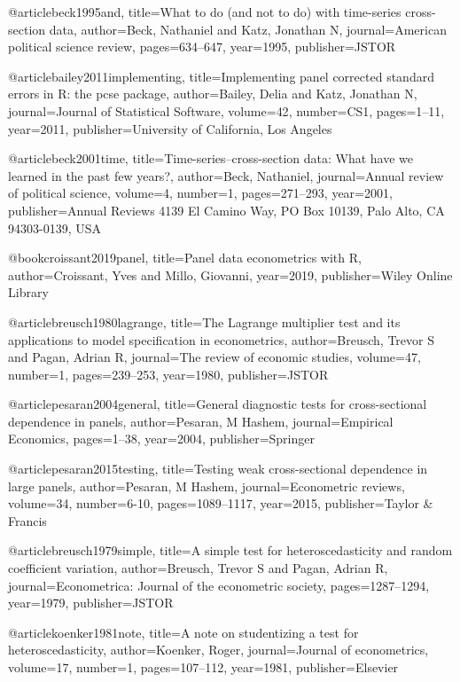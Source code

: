 @article{beck1995and,
  title={What to do (and not to do) with time-series cross-section data},
  author={Beck, Nathaniel and Katz, Jonathan N},
  journal={American political science review},
  pages={634--647},
  year={1995},
  publisher={JSTOR}
}

@article{bailey2011implementing,
  title={Implementing panel corrected standard errors in R: the pcse package},
  author={Bailey, Delia and Katz, Jonathan N},
  journal={Journal of Statistical Software},
  volume={42},
  number={CS1},
  pages={1--11},
  year={2011},
  publisher={University of California, Los Angeles}
}

@article{beck2001time,
  title={Time-series--cross-section data: What have we learned in the past few years?},
  author={Beck, Nathaniel},
  journal={Annual review of political science},
  volume={4},
  number={1},
  pages={271--293},
  year={2001},
  publisher={Annual Reviews 4139 El Camino Way, PO Box 10139, Palo Alto, CA 94303-0139, USA}
}

@book{croissant2019panel,
  title={Panel data econometrics with R},
  author={Croissant, Yves and Millo, Giovanni},
  year={2019},
  publisher={Wiley Online Library}
}

@article{breusch1980lagrange,
  title={The Lagrange multiplier test and its applications to model specification in econometrics},
  author={Breusch, Trevor S and Pagan, Adrian R},
  journal={The review of economic studies},
  volume={47},
  number={1},
  pages={239--253},
  year={1980},
  publisher={JSTOR}
}

@article{pesaran2004general,
  title={General diagnostic tests for cross-sectional dependence in panels},
  author={Pesaran, M Hashem},
  journal={Empirical Economics},
  pages={1--38},
  year={2004},
  publisher={Springer}
}

@article{pesaran2015testing,
  title={Testing weak cross-sectional dependence in large panels},
  author={Pesaran, M Hashem},
  journal={Econometric reviews},
  volume={34},
  number={6-10},
  pages={1089--1117},
  year={2015},
  publisher={Taylor \& Francis}
}

@article{breusch1979simple,
  title={A simple test for heteroscedasticity and random coefficient variation},
  author={Breusch, Trevor S and Pagan, Adrian R},
  journal={Econometrica: Journal of the econometric society},
  pages={1287--1294},
  year={1979},
  publisher={JSTOR}
}

@article{koenker1981note,
  title={A note on studentizing a test for heteroscedasticity},
  author={Koenker, Roger},
  journal={Journal of econometrics},
  volume={17},
  number={1},
  pages={107--112},
  year={1981},
  publisher={Elsevier}
}


